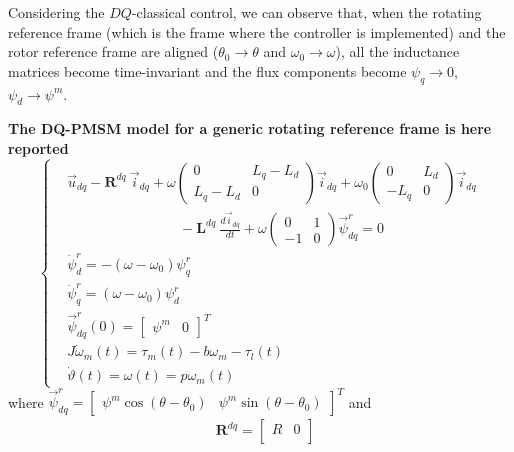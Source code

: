 \documentclass[12pt,a4paper]{scrartcl}
\begin{document}
\begin{onehalfspace}
Considering the $DQ$-classical control, we can observe that, when the rotating reference frame (which is the frame where the controller is implemented) and the rotor reference frame are aligned ($\theta_0 \rightarrow \theta$ and $\omega_0 \rightarrow \omega$), all the inductance matrices become time-invariant and the flux components become $\psi_{q} \rightarrow 0$, $\psi_{d} \rightarrow \psi^m$. 


\begin{mybox}
	\textbf{The DQ-PMSM model for a generic rotating reference frame is here reported}
	\begin{equation}\label{twophase_eq1bis}
		\left\lbrace \begin{aligned}
			& \vec{u}_{dq}-\mathbf{R}^{dq}\ \vec{i}_{dq} + \omega\begin{pmatrix} 0 & L_q-L_d\\ L_q-L_d & 0 \end{pmatrix}\vec{i}_{dq} + \omega_0\begin{pmatrix} 0 & L_d\\ -L_q & 0 \end{pmatrix}\vec{i}_{dq} \\[6pt]
			&\qquad \qquad \qquad \qquad - \mathbf{L}^{dq}\ \frac{d\vec{i}_{dq}}{dt} + \omega\begin{pmatrix} 0 & 1\\-1 & 0 \end{pmatrix}\vec{\psi}_{dq}^r = 0\\[6pt]
			&\dot{\psi}_d^r = -\left( \omega-\omega_0\right)\psi_q^r \\[6pt]
			&\dot{\psi}_q^r = \left( \omega-\omega_0\right)\psi_d^r \\[6pt]
			& \vec{\psi}^r_{dq}(0) = \begin{bmatrix} \psi^m &  0 \end{bmatrix}^T \\[6pt]
			& J\dot{\omega}_m(t) = \tau_m(t)-b{\omega}_m-\tau_l(t) \\[6pt]
			& \dot{\vartheta}(t) = \omega(t) = p\omega_m(t)
		\end{aligned} \right. 
	\end{equation}
	where $\vec{\psi}^r_{dq} = \begin{bmatrix} \psi^m\cos(\theta-\theta_0) &  \psi^m\sin(\theta-\theta_0)\end{bmatrix}^T$ and
	\begin{equation*}
		\begin{aligned}
			& \mathbf{R}^{dq} = 
			\begin{bmatrix} R &  0 \\

\end{bmatrix}
\end{aligned}
\end{equation*}
\end{mybox}
\end{onehalfspace}
\end{document}
